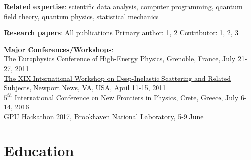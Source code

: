 \documentclass[margin,line]{resume}
\begin{document}
\begin{resume}
    \begin{list2}
    \item {\bf Related expertise}: scientific data analysis, computer programming, quantum field theory, quantum physics, statistical mechanics
    \item {\bf Research papers}: \href{http://inspirehep.net/author/profile/T.P.Stewart.1}{All publications} Primary author: \href{http://inspirehep.net/record/1183813}{1}, \href{https://pos.sissa.it/134/367}{2} Contributor: \href{http://inspirehep.net/record/811152}{1}, \href{http://inspirehep.net/record/1269458}{2}, \href{http://inspirehep.net/record/1501882}{3}
    \item {\bf Major Conferences/Workshops}: \\\href{http://hep2011.insight-outside.fr/}{The Europhysics Conference of High-Energy Physics, Grenoble, France, July 21-27, 2011}\\\href{https://www.jlab.org/conferences/dis2011/}{The XIX International Workshop on Deep-Inelastic Scattering and Related Subjects, Newport News, VA, USA, April 11-15, 2011}\\\href{https://indico.cern.ch/event/442094/}{$5^{th}$ International Conference on New Frontiers in Physics, Crete, Greece, July 6-14, 2016}\\\href{https://www.bnl.gov/gpuhackathon/}{GPU Hackathon 2017, Brookhaven National Laboratory, 5-9 June} 
    \end{list2}


    \section{\mysidestyle Education}


\end{resume}
\end{document}
